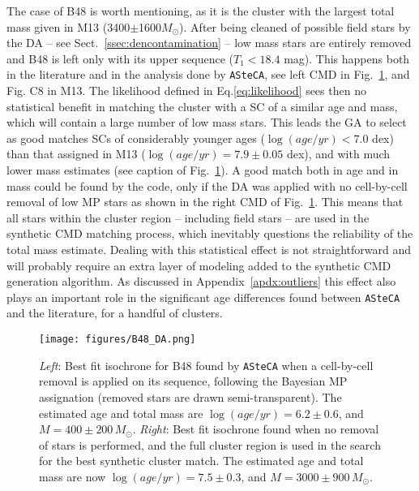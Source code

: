 \documentclass{aa}
\begin{document}
The case of B48 is worth mentioning, as it is the cluster with the largest total
mass given in M13 (3400$\pm$1600$M_{\odot}$).
After being cleaned of possible field stars by the DA -- see
Sect.~\ref{ssec:dencontamination} -- low mass stars are entirely removed and B48
is left only with its upper sequence ($T_1<18.4$ mag).
This happens both in the literature and in the analysis done by \texttt{ASteCA},
see left CMD in Fig.~\ref{fig:B48_DA}, and Fig. C8 in M13.
%
The likelihood defined in Eq.\ref{eq:likelihood} sees then no statistical
benefit in matching the cluster with a SC of a similar age and mass,
which will contain a large number of low mass stars.
This leads the GA to select as good matches SCs of considerably
younger ages ($\log(age/yr){<}7.0$ dex) than that assigned in M13
($\log(age/yr){=}7.9\pm0.05$ dex), and with much lower mass estimates (see
caption of Fig.~\ref{fig:B48_DA}).
%
%
A good match both in age and in mass could be found by the code, only if the DA
was applied with no cell-by-cell removal of low MP stars as shown in the right
CMD of Fig.~\ref{fig:B48_DA}. This means that all stars within the cluster
region -- including field stars -- are used in the synthetic CMD matching
process, which inevitably questions the reliability of the total mass estimate.
%
Dealing with this statistical effect is not straightforward and will probably
require an extra layer of modeling added to the synthetic CMD generation
algorithm.
As discussed in Appendix~\ref{apdx:outliers} this effect also plays an
important role in the significant age differences found between \texttt{ASteCA}
and the literature, for a handful of clusters.

\begin{figure}
\centering
\texttt{[image: figures/B48\_DA.png]}
\caption{\emph{Left}: Best fit isochrone for B48 found by \texttt{ASteCA} when
a cell-by-cell removal is applied on its sequence, following the Bayesian MP
assignation (removed stars are drawn semi-transparent). The estimated age and
total mass are $\log(age/yr){=}6.2{\pm}0.6$, and $M{=}400{\pm}200\,M_{\odot}$.
\emph{Right}: Best fit isochrone found when no removal of stars is performed,
and the full cluster region is used in the search for the best synthetic
cluster match. The estimated age and total mass are now
$\log(age/yr){=}7.5{\pm}0.3$, and $M{=}3000{\pm}900\,M_{\odot}$.}
\label{fig:B48_DA}
\end{figure}
\end{document}
